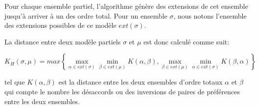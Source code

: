 				Pour chaque ensemble partiel, l'algorithme génère des extensions de cet ensemble jusqu'à arriver à un des ordre total. Pour un ensemble $\sigma$, nous notons l'ensemble des extensions possibles de ce modèle $ext(\sigma)$.
				
				La distance entre deux modèle partiels  $\sigma$ et $\mu$ est donc calculé comme suit: 

				
				\begin{equation*}
					K_H(\sigma,\mu) = max \left \{ \max\limits_{\alpha \in ext(\sigma)} \min\limits_{\beta \in ext(\mu)} K(\alpha , \beta), \max\limits_{\beta \in ext(\mu)} \min\limits_{\alpha \in ext(\sigma)} K(\beta, \alpha)  \right \}
				\end{equation*}
				
				tel que $K(\alpha , \beta)$ est la distance entre les deux ensembles d'ordre totaux $\alpha$ et $\beta$ qui compte le nombre les désaccords ou des inversions de paires de préférences entre les deux ensembles. 
				 
